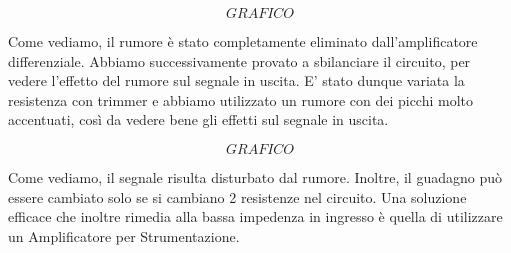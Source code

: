 $$GRAFICO$$

Come vediamo, il rumore è stato completamente eliminato dall'amplificatore differenziale. Abbiamo successivamente provato a sbilanciare il circuito, per vedere l'effetto del rumore sul segnale in uscita. E' stato dunque variata la resistenza con trimmer e abbiamo utilizzato un rumore con dei picchi molto accentuati, così da vedere bene gli effetti sul segnale in uscita. 

$$GRAFICO$$

Come vediamo, il segnale risulta disturbato dal rumore. Inoltre, il guadagno può essere cambiato solo se si cambiano 2 resistenze nel circuito. Una soluzione efficace che inoltre rimedia alla bassa impedenza in ingresso è quella di utilizzare un Amplificatore per Strumentazione.